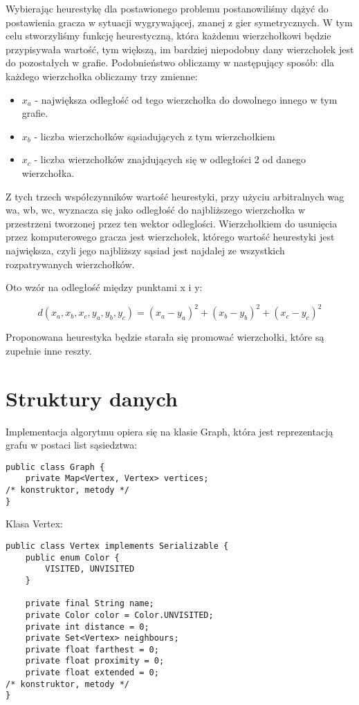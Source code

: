 \documentclass[11pt,a4paper]{article}
\begin{document}
Wybierając heurestykę dla postawionego problemu postanowiliśmy dążyć do postawienia gracza w sytuacji wygrywającej, znanej z gier symetrycznych. W tym celu stworzyliśmy funkcję heurestyczną, która każdemu wierzchołkowi będzie przypisywała wartość, tym większą, im bardziej niepodobny dany wierzchołek jest do pozostałych w grafie. Podobnieństwo obliczamy w następujący sposób: dla każdego wierzchołka obliczamy trzy zmienne: 
\begin{itemize}
\item $x_a$ - największa odległość od tego wierzchołka do dowolnego innego w tym grafie.
\item $x_b$ - liczba wierzchołków sąsiadujących z tym wierzchołkiem
\item $x_c$ - liczba wierzchołków znajdujących się w odległości 2 od danego wierzchołka. 
\end{itemize}

Z tych trzech współczynników wartość heurestyki, przy użyciu arbitralnych wag wa, wb, wc, wyznacza się jako odległość do najbliższego wierzchołka w przestrzeni tworzonej przez ten wektor odleglości. Wierzchołkiem do usunięcia przez komputerowego gracza jest wierzchołek, którego wartość heurestyki jest największa, czyli jego najbliższy sąsiad jest najdalej ze wszystkich rozpatrywanych wierzchołków.

Oto wzór na odległość między punktami x i y:

$$d(x_a,x_b,x_c,y_a,y_b,y_c)=(x_a-y_a)^2+(x_b-y_b)^2+(x_c-y_c)^2 $$

Proponowana heurestyka będzie starała się promować wierzchołki, które są zupełnie inne reszty.

\section{Struktury danych}

Implementacja algorytmu opiera się na klasie Graph, która jest reprezentacją grafu w postaci list sąsiedztwa:
\begin{lstlisting}
public class Graph {
    private Map<Vertex, Vertex> vertices;
/* konstruktor, metody */
}
\end{lstlisting}
Klasa Vertex:
\begin{lstlisting}
public class Vertex implements Serializable {
	public enum Color {
		VISITED, UNVISITED
	}

	private final String name;
	private Color color = Color.UNVISITED;
	private int distance = 0;
	private Set<Vertex> neighbours;
	private float farthest = 0;
	private float proximity = 0;
	private float extended = 0;
/* konstruktor, metody */
}	
\end{lstlisting}
\end{document}
